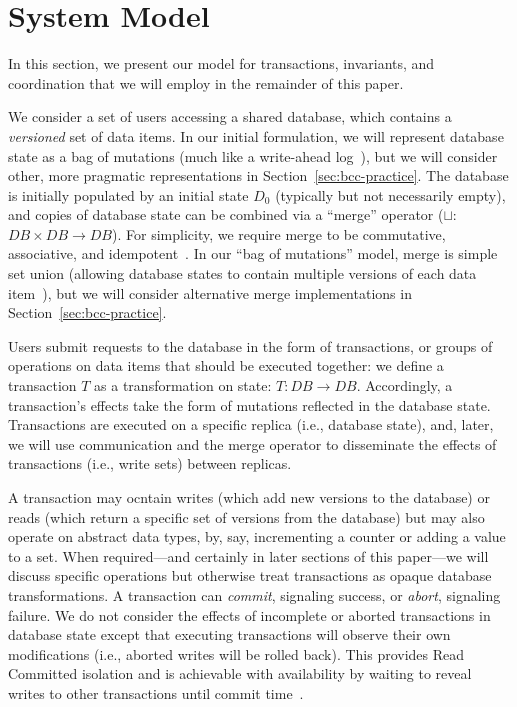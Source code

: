 
\section{System Model}
\label{sec:model}

In this section, we present our model for transactions, invariants,
and coordination that we will employ in the remainder of this paper.

 We consider a set of users accessing a shared
database, which contains a \textit{versioned} set of data items. In
our initial formulation, we will represent database state as a bag of
mutations (much like a write-ahead log~\cite{bernstein-book}), but we will
consider other, more pragmatic representations in
Section~\ref{sec:bcc-practice}. The database is initially populated by
an initial state $D_0$ (typically but not necessarily empty), and
copies of database state can be combined via a ``merge'' operator
($\sqcup$: $DB \times DB \rightarrow DB$).  For simplicity, we require
merge to be commutative, associative, and
idempotent~\cite{calm,crdt}. In our ``bag of mutations'' model, merge
is simple set union (allowing database states to contain multiple
versions of each data item~\cite{adya-isolation}), but we will
consider alternative merge implementations in
Section~\ref{sec:bcc-practice}.

 Users submit requests to the database in the
form of transactions, or groups of operations on data items that
should be executed together: we define a transaction $T$ as a
transformation on state: $T: DB \rightarrow DB$. Accordingly, a
transaction's effects take the form of mutations reflected in the
database state. Transactions are executed on a specific replica (i.e.,
database state), and, later, we will use communication and the merge
operator to disseminate the effects of transactions (i.e., write sets)
between replicas.

A transaction may ocntain writes (which add new versions to the
database) or reads (which return a specific set of versions from the
database) but may also operate on abstract data types, by, say,
incrementing a counter or adding a value to a set. When required---and
certainly in later sections of this paper---we will discuss specific
operations but otherwise treat transactions as opaque database
transformations. A transaction can \textit{commit}, signaling success,
or \textit{abort}, signaling failure. We do not consider the effects
of incomplete or aborted transactions in database state except that
executing transactions will observe their own modifications (i.e.,
aborted writes will be rolled back). This provides Read Committed
isolation and is achievable with availability by waiting to reveal
writes to other transactions until commit
time~\cite{hat-vldb,spanner}.

